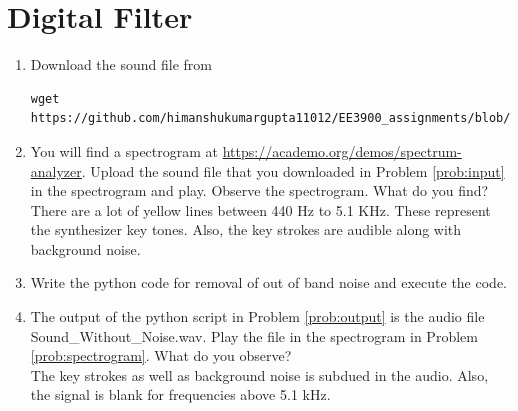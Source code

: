 \documentclass[journal,12pt,twocolumn]{IEEEtran}
\renewcommand\thesection{\arabic{section}}
\begin{document}
\section{Digital Filter}
\begin{enumerate}[label=\thesection.\arabic*
,ref=\thesection.\theenumi]
\item
\label{prob:input}
Download the sound file from  
\begin{lstlisting}
wget https://github.com/himanshukumargupta11012/EE3900_assignments/blob/master/assignment_1/ques_2/Sound_Noise.wav
\end{lstlisting}
\item
\label{prob:spectrogram}
You will find a spectrogram at \href{https://academo.org/demos/spectrum-analyzer}{\url{https://academo.org/demos/spectrum-analyzer}}. 
%
Upload the sound file that you downloaded in Problem \ref{prob:input} in the spectrogram  and play.  Observe the spectrogram. What do you find?
\\
%
\solution There are a lot of yellow lines between 440 Hz to 5.1 KHz.  These represent the synthesizer key tones. Also, the key strokes
are audible along with background noise.
\item
\label{prob:output}
Write the python code for removal of out of band noise and execute the code.
\\
\solution

%
\item
The output of the python script in Problem \ref{prob:output} is the audio file Sound\_Without\_Noise.wav. Play the file in the spectrogram in Problem \ref{prob:spectrogram}. What do you observe?
\\
\solution The key strokes as well as background noise is subdued in the audio.  Also,  the signal is blank for frequencies above 5.1 kHz.

\end{enumerate}
\end{document}
